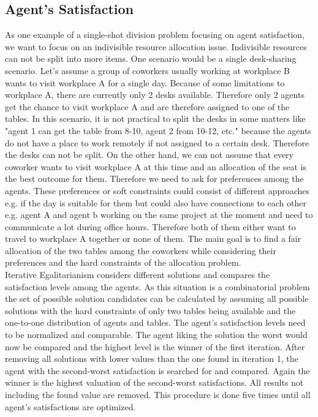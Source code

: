 \documentclass[german, a4paper, 11pt, oneside]{scrbook}
\begin{document}
\subsection{Agent's Satisfaction}
As one example of a single-shot division problem focusing on agent satisfaction, we want to focus on an indivisible resource allocation issue.
Indivisible resources can not be split into more items. One scenario would be a single desk-sharing scenario. Let's assume a group of coworkers usually working at workplace B wants to visit workplace A for a single day. Because of some limitations to workplace A, there are currently only 2 desks available. Therefore only 2 agents get the chance to visit workplace A and are therefore assigned to one of the tables. In this scenario, it is not practical to split the desks in some matters like "agent 1 can get the table from 8-10, agent 2 from 10-12, etc." because the agents do not have a place to work remotely if not assigned to a certain desk. Therefore the desks can not be split. On the other hand, we can not assume that every coworker wants to visit workplace A at this time and an allocation of the seat is the best outcome for them. Therefore we need to ask for preferences among the agents. These preferences or soft constraints could consist of different approaches e.g. if the day is suitable for them but could also have connections to each other e.g. agent A and agent b working on the same project at the moment and need to communicate a lot during office hours. Therefore both of them either want to travel to workplace A together or none of them. The main goal is to find a fair allocation of the two tables among the coworkers while considering their preferences and the hard constraints of the allocation problem.
\\Iterative Egalitarianism considers different solutions and compares the satisfaction levels among the agents. As this situation is a combinatorial problem the set of possible solution candidates can be calculated by assuming all possible solutions with the hard constraints of only two tables being available and the one-to-one distribution of agents and tables. The agent's satisfaction levels need to be normalized and comparable. The agent liking the solution the worst would now be compared and the highest level is the winner of the first iteration. After removing all solutions with lower values than the one found in iteration 1, the agent with the second-worst satisfaction is searched for and compared. Again the winner is the highest valuation of the second-worst satisfactions. All results not including the found value are removed. This procedure is done five times until all agent's satisfactions are optimized. 
\end{document}
